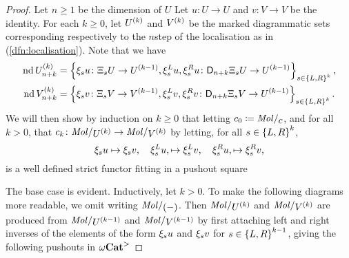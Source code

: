\begin{proof}
    Let \( n \geq 1 \) be the dimension of \( U \)
    Let \( u \colon U \to U \) and \( v \colon V \to V \) be the identity.
    For each \( k \geq 0 \), let \( \order{k}{U} \) and \( \order{k}{V} \) be the marked diagrammatic sets corresponding respectively to the \( n \)\nbd step of the localisation as in (\ref{dfn:localisation}).
    Note that we have
    \begin{align*}
        \nd \gr{n + k}{\order{k}{U}} &= \set{\hinv{s}u \colon \hcyl{s} U \to \order{k - 1}{U}, \hinv{s}^Lu, \hinv{s}^Ru \colon \dual{n + k}{\hcyl{s} U} \to \order{k - 1}{U}}_{s \in \set{L, R}^k},\\
        \nd \gr{n + k}{\order{k}{V}} &= \set{\hinv{s}v \colon \hcyl{s} V \to \order{k - 1}{V}, \hinv{s}^Lv, \hinv{s}^Rv \colon \dual{n + k}{\hcyl{s} V} \to \order{k - 1}{U}}_{s \in \set{L, R}^k}.
    \end{align*}
    We will then show by induction on \( k \geq 0 \) that letting \( c_0 \eqdef \molecin{c} \), and for all \( k > 0 \), that \( c_k \colon \molecin{\order{k}{U}} \to \molecin{\order{k}{V}} \) by letting, for all \( s \in \set{L, R}^k \),
    \begin{equation*}
        \hinv{s}u \mapsto \hinv{s}v,\quad \hinv{s}^Lu, \mapsto \hinv{s}^Lv,\quad \hinv{s}^Ru, \mapsto \hinv{s}^Rv,
    \end{equation*}
    is a well defined strict functor fitting in a pushout square
    \begin{center} \label{tik:inductive_square_subdivision_localisation}
    \end{center}
    The base case is evident.
    Inductively, let \( k > 0 \).
    To make the following diagrams more readable, we omit writing \( \molecin{(-)} \). 
    Then \( {\molecin{\order k U}} \) and \( {\molecin{\order k V}} \) are produced from \( {\molecin{\order {k - 1} U}} \) and \( {\molecin{\order {k - 1} V}} \) by first attaching left and right inverses of the elements of the form \( \hinv{s}u \) and \( \hinv{s}v \) for \( s \in \set{L, R}^{k - 1} \), giving the following pushouts in \( \somegaCat \)

\end{proof}
